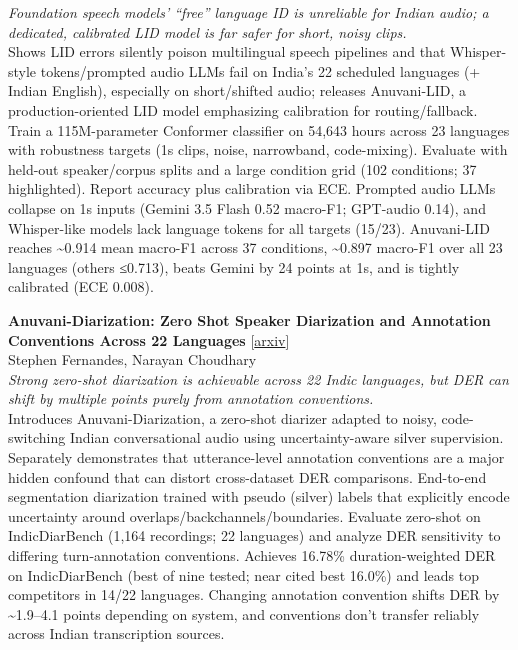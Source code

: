 \documentclass[12pt,letterpaper]{article}
\begin{document}
{\small\textit{Foundation speech models' ``free'' language ID is unreliable for Indian audio; a dedicated, calibrated LID model is far safer for short, noisy clips.}}\\[1pt]
{\footnotesize Shows LID errors silently poison multilingual speech pipelines and that Whisper-style tokens/prompted audio LLMs fail on India's 22 scheduled languages (+ Indian English), especially on short/shifted audio; releases Anuvani-LID, a production-oriented LID model emphasizing calibration for routing/fallback. Train a 115M-parameter Conformer classifier on 54,643 hours across 23 languages with robustness targets (1s clips, noise, narrowband, code-mixing). Evaluate with held-out speaker/corpus splits and a large condition grid (102 conditions; 37 highlighted). Report accuracy plus calibration via ECE. Prompted audio LLMs collapse on 1s inputs (Gemini 3.5 Flash 0.52 macro-F1; GPT-audio 0.14), and Whisper-like models lack language tokens for all targets (15/23). Anuvani-LID reaches \textasciitilde{}0.914 mean macro-F1 across 37 conditions, \textasciitilde{}0.897 macro-F1 over all 23 languages (others ≤0.713), beats Gemini by 24 points at 1s, and is tightly calibrated (ECE 0.008).}

\medskip

{\small\textbf{Anuvani-Diarization: Zero Shot Speaker Diarization and Annotation Conventions Across 22 Languages}} {\scriptsize[\href{https://arxiv.org/abs/2610.20327}{arxiv}]}\\
{\scriptsize Stephen Fernandes, Narayan Choudhary}\\

{\small\textit{Strong zero-shot diarization is achievable across 22 Indic languages, but DER can shift by multiple points purely from annotation conventions.}}\\[1pt]
{\footnotesize Introduces Anuvani-Diarization, a zero-shot diarizer adapted to noisy, code-switching Indian conversational audio using uncertainty-aware silver supervision. Separately demonstrates that utterance-level annotation conventions are a major hidden confound that can distort cross-dataset DER comparisons. End-to-end segmentation diarization trained with pseudo (silver) labels that explicitly encode uncertainty around overlaps/backchannels/boundaries. Evaluate zero-shot on IndicDiarBench (1,164 recordings; 22 languages) and analyze DER sensitivity to differing turn-annotation conventions. Achieves 16.78\% duration-weighted DER on IndicDiarBench (best of nine tested; near cited best 16.0\%) and leads top competitors in 14/22 languages. Changing annotation convention shifts DER by \textasciitilde{}1.9--4.1 points depending on system, and conventions don't transfer reliably across Indian transcription sources.}
\end{document}
